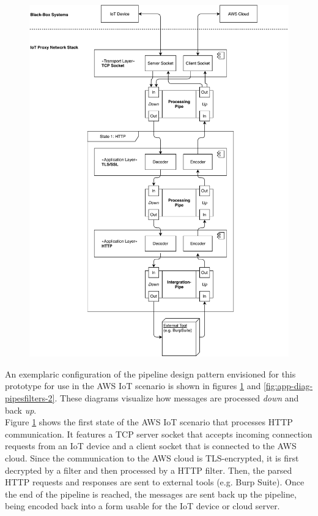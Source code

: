 \begin{figure}[h!]
    \centering
    \includegraphics[width=14cm]{img/ch04/Architecture - PipesFilters 1.pdf}
    \label{fig:app-diag-pipesfilters-1}
\end{figure}
An exemplaric configuration of the pipeline design pattern envisioned for this prototype for use in the \ac{AWS} \ac{IoT} scenario is shown in figures \ref{fig:app-diag-pipesfilters-1} and \ref{fig:app-diag-pipesfilters-2}. These diagrams visualize how messages are processed \emph{down} and back \emph{up}.\\
Figure \ref{fig:app-diag-pipesfilters-1} shows the first state of the \ac{AWS} \ac{IoT} scenario that processes \ac{HTTP} communication. It features a TCP server socket that accepts incoming connection requests from an \ac{IoT} device and a client socket that is connected to the \ac{AWS} cloud. Since the communication to the \ac{AWS} cloud is \ac{TLS}-encrypted, it is first decrypted by a filter and then processed by a \ac{HTTP} filter. Then, the parsed \ac{HTTP} requests and responses are sent to external tools (e.g. Burp Suite). Once the end of the pipeline is reached, the messages are sent back up the pipeline, being encoded back into a form usable for the \ac{IoT} device or cloud server.\\
